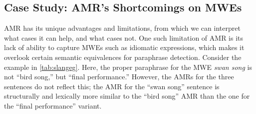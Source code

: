 \subsection{Case Study: AMR's Shortcomings on MWEs}\label{sec:mwe}
AMR has its unique advantages and limitations, from which we can interpret what cases it can help, and what cases not. One such limitation of AMR is its lack of ability to capture MWEs such as idiomatic expressions, which makes it overlook certain semantic equivalences for paraphrase detection.
Consider the example in \cref{tab:slangeg}. Here, the proper paraphrase for the MWE \textit{swan song} is not ``bird song,'' but ``final performance.''
However, the AMRs for the three sentences do not reflect this; the AMR for the ``swan song'' sentence is structurally and lexically more similar to the ``bird song'' AMR than the one for the ``final performance'' variant.
